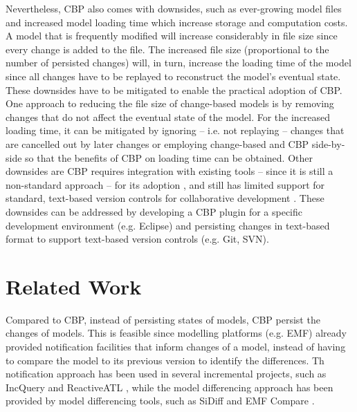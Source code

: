 \documentclass[sigplan,review,anonymous]{acmart}\settopmatter{printfolios=true,printccs=false,printacmref=false}
\begin{document}
Nevertheless, CBP also comes with downsides, such as ever-growing model files \cite{DBLP:journals/entcs/RobbesL07,DBLP:conf/edoc/KoegelHLHD10} and increased model loading time \cite{mens2002state} which increase storage and computation costs. A model that is frequently modified will increase considerably in file size since every change is added to the file. The increased file size (proportional to the number of persisted changes) will, in turn, increase the loading time of the model since all changes have to be replayed to reconstruct the model's eventual state. These downsides have to be mitigated to enable the practical adoption of CBP. One approach to reducing the file size of change-based models is by removing changes that do not affect the eventual state of the model. For the increased loading time, it can be mitigated by ignoring -- i.e. not replaying -- changes that are cancelled out by later changes or employing change-based and CBP side-by-side so that the benefits of CBP on loading time can be obtained. Other downsides are CBP requires integration with existing tools -- since it is still a non-standard approach -- for its adoption \cite{koegel2010emfstore}, and still has limited support for standard, text-based version controls for collaborative development \cite{koegel2010emfstore}. These downsides can be addressed by developing a CBP plugin for a specific development environment (e.g. Eclipse) and persisting changes in text-based format to support text-based version controls (e.g. Git, SVN).


\section{Related Work}
\label{sec:related_work}
Compared to CBP, instead of persisting states of models, CBP persist the changes of models. This is feasible since modelling platforms (e.g. EMF) already provided notification facilities that inform changes of a model, instead of having to compare the model to its previous version to identify the differences. Th notification approach has been used in several incremental projects, such as IncQuery \cite{DBLP:conf/ecmdafa/RathHV12} and ReactiveATL \cite{DBLP:conf/ecmdafa/OgunyomiRK15}, while the model differencing approach has been provided by model differencing tools, such as SiDiff \cite{kelter2005generic} and EMF Compare \cite{eclipse2017compare}.
\end{document}
